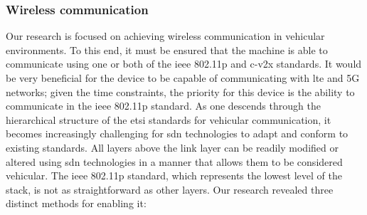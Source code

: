 \subsubsection{Wireless communication}
Our research is focused on achieving wireless communication in vehicular environments. To this end, it must be ensured that the machine is able to communicate using one or both of the \gls{ieee} 802.11p and \gls{c-v2x} standards. It would be very beneficial for the device to be capable of communicating with \gls{lte} and 5G networks; given the time constraints, the priority for this device is the ability to communicate in the \gls{ieee} 802.11p standard.
As one descends through the hierarchical structure of the \gls{etsi} standards for vehicular communication, it becomes increasingly challenging for \gls{sdn} technologies to adapt and conform to existing standards. All layers above the link layer can be readily modified or altered using \gls{sdn} technologies in a manner that allows them to be considered vehicular. The \gls{ieee} 802.11p standard, which represents the lowest level of the stack, is not as straightforward as other layers. Our research revealed three distinct methods for enabling it:
